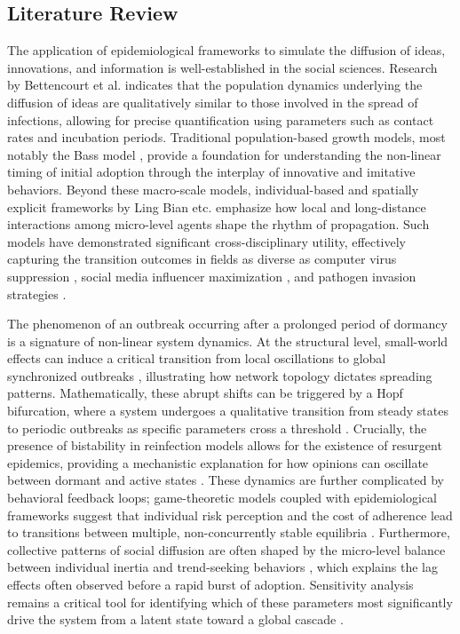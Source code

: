 \documentclass{article}
\begin{document}
\subsection{Literature Review}
\indent
The application of epidemiological frameworks to simulate the diffusion of ideas, innovations, and information is well-established in the social sciences. Research by Bettencourt et al. \cite{BETTENCOURT2006513} indicates that the population dynamics underlying the diffusion of ideas are qualitatively similar to those involved in the spread of infections, allowing for precise quantification using parameters such as contact rates and incubation periods. Traditional population-based growth models, most notably the Bass model \cite{916272ae-6b7a-3e62-b7e2-5747187dae7b}, provide a foundation for understanding the non-linear timing of initial adoption through the interplay of innovative and imitative behaviors. Beyond these macro-scale models, individual-based and spatially explicit frameworks by Ling Bian etc. \cite{doi:10.1068/b2833} emphasize how local and long-distance interactions among micro-level agents shape the rhythm of propagation. Such models have demonstrated significant cross-disciplinary utility, effectively capturing the transition outcomes in fields as diverse as computer virus suppression \cite{PIQUEIRA2009355}, social media influencer maximization \cite{MORE2019102}, and pathogen invasion strategies \cite{annurev:/content/journals/10.1146/annurev.phyto.45.062806.094357, doi:10.1177/0885728810387922}.

The phenomenon of an outbreak occurring after a prolonged period of dormancy is a signature of non-linear system dynamics. At the structural level, small-world effects can induce a critical transition from local oscillations to global synchronized outbreaks \cite{PhysRevLett.86.2909}, illustrating how network topology dictates spreading patterns. Mathematically, these abrupt shifts can be triggered by a Hopf bifurcation, where a system undergoes a qualitative transition from steady states to periodic outbreaks as specific parameters cross a threshold \cite{XIAO2001733}. Crucially, the presence of bistability in reinfection models allows for the existence of resurgent epidemics, providing a mechanistic explanation for how opinions can oscillate between dormant and active states \cite{8353159}. These dynamics are further complicated by behavioral feedback loops; game-theoretic models coupled with epidemiological frameworks suggest that individual risk perception and the cost of adherence lead to transitions between multiple, non-concurrently stable equilibria \cite{doi:10.1073/pnas.2311584120}. Furthermore, collective patterns of social diffusion are often shaped by the micro-level balance between individual inertia \cite{alos2016inertia} and trend-seeking behaviors \cite{ye2021collective}, which explains the lag effects often observed before a rapid burst of adoption. Sensitivity analysis remains a critical tool for identifying which of these parameters most significantly drive the system from a latent state toward a global cascade \cite{https://doi.org/10.1155/2013/721406}.
\end{document}

